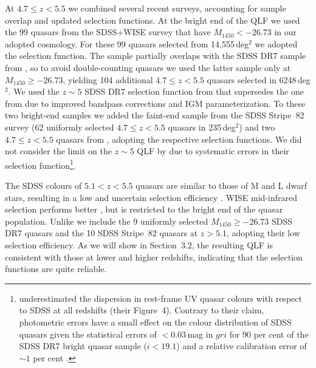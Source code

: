 \documentclass[fleqn,usenatbib]{mnras}
\begin{document}
At $4.7\le z<5.5$ we combined several recent surveys, accounting for
sample overlap and updated selection functions. At the bright end of
the QLF we used the 99 quasars from the SDSS+WISE survey
\citep{2016ApJ...829...33Y} that have $M_{1450}<-26.73$ in our adopted
cosmology.  For these 99 quasars selected from 14,555\,deg$^2$ we
adopted the \citet{2016ApJ...829...33Y} selection function.  The
\citet{2016ApJ...829...33Y} sample partially overlaps with the SDSS
DR7 sample from \citet{2013ApJ...768..105M}, so to avoid
double-counting quasars we used the latter sample only at $M_{1450}\ge
-26.73$, yielding 104 additional $4.7\le z<5.5$ quasars selected in
6248\,deg$^2$. We used the $z\sim 5$ SDSS DR7 selection function from
\citet{2013ApJ...768..105M} that supersedes the one from
\citet{2006AJ....131.2766R} due to improved bandpass corrections and IGM
parameterization.  To these two bright-end samples we added the
faint-end sample from the \citet{2013ApJ...768..105M} SDSS Stripe~82
survey (62 uniformly selected $4.7\le z<5.5$ quasars in 235\,deg$^2$)
and two $4.7\le z<5.5$ quasars from \citet{2011ApJ...728L..26G},
adopting the respective selection functions.  We did not consider the
limit on the $z\sim 5$ QLF by \citet{2012ApJ...756..160I} due to
systematic errors in their selection
function\footnote{\citet{2012ApJ...756..160I} underestimated the
  dispersion in rest-frame UV quasar colours with respect to SDSS at
  all redshifts (their Figure~4). Contrary to their claim, photometric
  errors have a small effect on the colour distribution of SDSS
  quasars given the statistical errors of $<0.03$\,mag in $gri$ for 90
  per cent of the SDSS DR7 bright quasar sample ($i<19.1$) and a
  relative calibration error of $\sim 1$ per cent
  \citep{2008ApJ...674.1217P}.}.

The SDSS colours of $5.1<z<5.5$ quasars are similar to those of M and
L dwarf stars, resulting in a low and uncertain selection efficiency
\citep{2013ApJ...768..105M}. WISE mid-infrared selection performs
better \citep{2016ApJ...829...33Y}, but is restricted to the bright
end of the quasar population. Unlike \citet{2013ApJ...768..105M} we
include the 9 uniformly selected $M_{1450}\ge -26.73$ SDSS DR7 quasars
and the 10 SDSS Stripe~82 quasars at $z>5.1$, adopting their low
selection efficiency.
As we will show in Section~3.2, the resulting
QLF is consistent with those at lower and higher redshifts, indicating
that the \citet{2013ApJ...768..105M} selection functions are quite
reliable.
\end{document}
